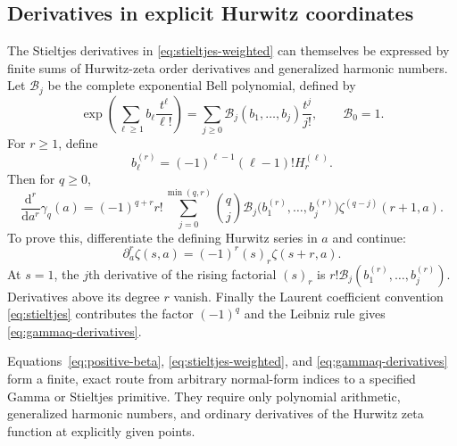 \subsection{Derivatives in explicit Hurwitz coordinates}

The Stieltjes derivatives in \eqref{eq:stieltjes-weighted} can themselves be expressed by finite sums of Hurwitz-zeta order derivatives and generalized harmonic numbers. Let $\mathcal B_j$ be the complete exponential Bell polynomial, defined by
\[
 \exp\left(\sum_{\ell\ge1}b_\ell\frac{t^\ell}{\ell!}\right)
 =\sum_{j\ge0}\mathcal B_j(b_1,\ldots,b_j)\frac{t^j}{j!},
 \qquad \mathcal B_0=1.
\]
For $r\ge1$, define
\[
 b_\ell^{(r)}=(-1)^{\ell-1}(\ell-1)!H_r^{(\ell)}.
\]
Then for $q\ge0$,
\begin{equation}\label{eq:gammaq-derivatives}
 \frac{\mathrm d^r}{\mathrm da^r}\gamma_q(a)
 =(-1)^{q+r}r!\sum_{j=0}^{\min(q,r)}\binom qj
   \mathcal B_j\bigl(b_1^{(r)},\ldots,b_j^{(r)}\bigr)
   \zeta^{(q-j)}(r+1,a).
\end{equation}
To prove this, differentiate the defining Hurwitz series in $a$ and continue:
\[
 \partial_a^r\zeta(s,a)=(-1)^r(s)_r\zeta(s+r,a).
\]
At $s=1$, the $j$th derivative of the rising factorial $(s)_r$ is
$r!\mathcal B_j(b_1^{(r)},\ldots,b_j^{(r)})$. Derivatives above its degree $r$ vanish. Finally the Laurent coefficient convention \eqref{eq:stieltjes} contributes the factor $(-1)^q$ and the Leibniz rule gives \eqref{eq:gammaq-derivatives}.

Equations~\eqref{eq:positive-beta}, \eqref{eq:stieltjes-weighted}, and \eqref{eq:gammaq-derivatives} form a finite, exact route from arbitrary normal-form indices to a specified Gamma or Stieltjes primitive. They require only polynomial arithmetic, generalized harmonic numbers, and ordinary derivatives of the Hurwitz zeta function at explicitly given points.
